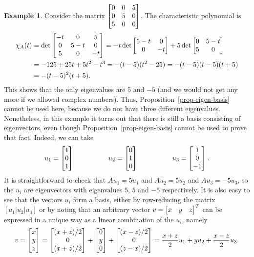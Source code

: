 \documentclass[reqno]{amsart}
\theoremstyle{definition}
\newtheorem{example}[theorem]{Example}
\begin{document}
\begin{example}\label{eg-eigen-basis-iv}
 Consider the matrix $\left[\begin{matrix} 0&0&5\\0&5&0\\5&0&0\end{matrix}\right]$.  The
 characteristic polynomial is
 \begin{align*}
  \chi_A(t)
    &= \det\left[\begin{matrix} -t&0&5 \\ 0&5-t&0 \\ 5&0&-t \end{matrix}\right]
     = -t\det\left[\begin{matrix} 5-t&0\\ 0&-t\end{matrix}\right]
       +5\det\left[\begin{matrix} 0&5-t\\ 5&0\end{matrix}\right] \\
    &= -125+25t+5t^2-t^3 = -(t-5)(t^2-25) = -(t-5)(t-5)(t+5) \\
    &= -(t-5)^2(t+5).
 \end{align*}
 This shows that the only eigenvalues are $5$ and $-5$ (and we would
 not get any more if we allowed complex numbers).  Thus,
 Proposition~\ref{prop-eigen-basis} cannot be used here, because we do
 not have three different eigenvalues.  Nonetheless, in this example
 it turns out that there is still a basis consisting of eigenvectors,
 even though Proposition~\ref{prop-eigen-basis} cannot be used to
 prove that fact.  Indeed, we can take
 \[ u_1 = \left[\begin{matrix} 1 \\ 0 \\ 1 \end{matrix}\right] \hspace{5em}
    u_2 = \left[\begin{matrix} 0 \\ 1 \\ 0 \end{matrix}\right] \hspace{5em}
    u_3 = \left[\begin{matrix} 1 \\ 0 \\ -1 \end{matrix}\right].
 \]
 It is straightforward to check that $Au_1=5u_1$ and $Au_2=5u_2$ and
 $Au_3=-5u_3$, so the $u_i$ are eigenvectors with eigenvalues $5$, $5$
 and $-5$ respectively.  It is also easy to see that the vectors $u_i$
 form a basis, either by row-reducing the matrix $[u_1|u_2|u_3]$ or by
 noting that an arbitrary vector $v=\left[\begin{matrix} x & y & z\end{matrix}\right]^T$ can be
 expressed in a unique way as a linear combination of the $u_i$,
 namely
 \[ v =
    \left[\begin{matrix} x\\ y\\ z\end{matrix}\right] =
    \left[\begin{matrix} (x+z)/2\\ 0\\ (x+z)/2\end{matrix}\right] +
    \left[\begin{matrix} 0\\ y\\ 0\end{matrix}\right] +
    \left[\begin{matrix} (x-z)/2\\ 0\\ (z-x)/2\end{matrix}\right] =
    \frac{x+z}{2}u_1 + y u_2 + \frac{x-z}{2} u_3.
 \]
\end{example}
\end{document}
